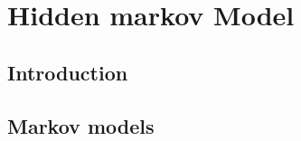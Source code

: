 \chapter{Hidden markov Model}


\section{Introduction}


\section{Markov models}
\label{sec:Markov-models}

